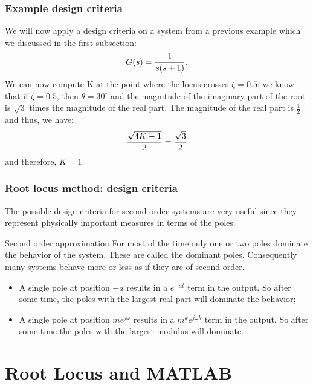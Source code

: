 \begin{frame}
\frametitle{Example design criteria}
	\begin{example}
		We will now apply a design criteria on a system from a previous example which we discussed in the first subsection:
		\vspace{-0.5em}
		\begin{equation}
		G(s) = \frac{1}{s(s+1)}.
		\vspace{-0.5em}
		\end{equation}
		We can now compute K at the point where the locus crosses $\zeta = 0.5$: we know that if $\zeta = 0.5$, then $\theta = 30^{\circ}$ and the magnitude of the imaginary part of the root is $\sqrt{3}$ times the magnitude of the real part. The magnitude of the real part is $\frac{1}{2}$ and thus, we have:
		\vspace{-0.5em}
		\begin{equation}
		\frac{\sqrt{4K - 1}}{2} = \frac{\sqrt{3}}{2}
		\vspace{-0.5em}
		\end{equation}
		and therefore, $K = 1$.
	\end{example}
\end{frame}

\begin{frame}
\frametitle{Root locus method: design criteria}
	The possible design criteria for second order systems are very useful since they represent physically important measures in terms of the poles.\\
	\begin{alertblock}{Second order approximation}
		For most of the time only one or two poles dominate the behavior of the system. These are called the dominant poles. Consequently many systems behave more or less as if they are of second order. 
	\end{alertblock}
	\begin{itemize}
		\item A single pole at position $-a$ results in a $e^{-at}$ term in the output. So after some time, the poles with the largest real part will dominate the behavior;
		\item A single pole at position $me^{j\omega}$ results in a $m^ke^{j\omega k}$ term in the output. So after some time the poles with the largest modulus will dominate. 
	\end{itemize}
\end{frame}
	
\section{Root Locus and MATLAB}

